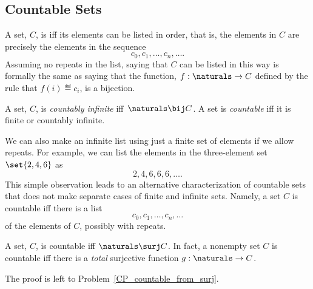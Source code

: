 \subsection{Countable Sets}\label{countable_subsec}
A set, $C$, is  iff its elements can be listed in
order, that is, the elements in $C$ are precisely the elements in the
sequence
\[
c_0, c_1, \dots, c_n, \dots.
\]
Assuming no repeats in the list, saying that $C$ can be listed in this
way is formally the same as saying that the function, $f:\naturals \to
C$ defined by the rule that $f(i) \eqdef c_i$, is a bijection.

\begin{definition}
A set, $C$, is \emph{countably infinite}%
 iff\  $\naturals \bij C$.  A
set is \emph{countable} iff it is finite or countably infinite.
\end{definition}

We can also make an infinite list using just a finite set of elements
if we allow repeats.  For example, we can list the elements in the
three-element set $\set{2, 4, 6}$ as
\[
2,4,6,6,6,\dots.
\]
This simple observation leads to an alternative characterization of
countable sets that does not make separate cases of finite and
infinite sets.  Namely, a set $C$ is countable iff there is a list
\[
c_0, c_1, \dots, c_n, \dots
\]
of the elements of $C$, possibly with repeats.

\begin{lemma}\label{NsurjC}
A set, $C$, is countable iff $\naturals \surj C$.  In fact, a nonempty
set $C$ is countable iff there is a \emph{total} surjective function
$g:\naturals \to C$.
\end{lemma}
The proof is left to Problem~\ref{CP_countable_from_surj}.

